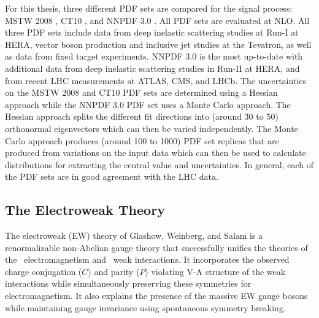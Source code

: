 For this thesis, three different PDF sets are compared for the signal 
process: MSTW 2008 \cite{Martin:2009iq}, CT10 \cite{guzzi:2011sv},  and
NNPDF 3.0 \cite{Ball:2014uwa}. All PDF sets are evaluated at NLO.
All three PDF sets include data from deep inelastic scattering studies
at Run-I at HERA, vector boson production and 
inclusive jet studies at the Tevatron, as well as data from fixed
target experiments.
NNPDF 3.0 is the most up-to-date with additional 
data from deep inelastic scattering
studies in Run-II at HERA, and from recent LHC measurements at ATLAS, CMS, and
LHCb.
The uncertainties on the MSTW 2008 and CT10 PDF sets are 
determined using a Hessian approach while the NNPDF 3.0 PDF set uses
a Monte Carlo approach.
The Hessian approach splits the different fit directions into 
(around 30 to 50) orthonormal eigenvectors which can then be varied independently.
The Monte Carlo approach produces (around 100 to 1000) PDF set replicas
that are produced from variations on the input data which can then be used
to calculate distributions for extracting the central value and uncertainties.
In general, each of the PDF sets are in good agreement with the LHC data.




\subsection{The Electroweak Theory}
\label{sec:theory_ew}
The electroweak (EW) 
theory of Glashow, Weinberg, and 
Salam \cite{glashow:1961tr,Salam:1968rm,weinberg:1967tq}
is a renormalizable \cite{hooft1971renormalization,Hooft1971167}
non-Abelian gauge theory 
that successfully unifies the theories 
of the \uone~electromagnetism and \sutwo~weak interactions.
It incorporates the observed 
charge conjugation ($C$) 
and parity ($P$) violating V-A structure of the weak interactions
\cite{PhysRev.105.1413,Garwin:1957hc,PhysRev.106.1290}
while simultaneously preserving these symmetries for electromagnetism.
It also explains the presence of the massive EW gauge bosons 
while maintaining gauge invariance
using spontaneous symmetry breaking.

